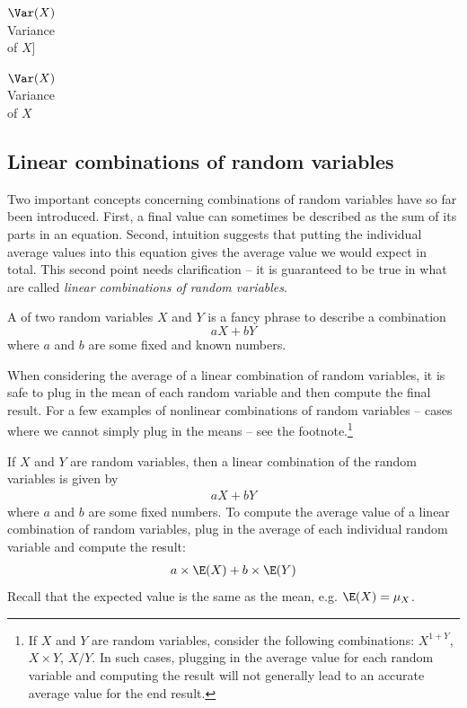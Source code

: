 $\Var(X)$\vspace{1mm}\\\footnotesize Variance\\of $X$]{\raggedright\vspace{-47mm}

$\Var(X)$\vspace{1mm}\\\footnotesize Variance\\of $X$}


\subsection{Linear combinations of random variables}

Two important concepts concerning combinations of random variables have so far been introduced. First, a final value can sometimes be described as the sum of its parts in an equation. Second, intuition suggests that putting the individual average values into this equation gives the average value we would expect in total. This second point needs clarification -- it is guaranteed to be true in what are called \emph{linear combinations of random variables}.

A  of two random variables $X$ and $Y$ is a fancy phrase to describe a combination
$$ aX + bY$$
where $a$ and $b$ are some fixed and known numbers.

When considering the average of a linear combination of random variables, it is safe to plug in the mean of each random variable and then compute the final result. For a few examples of nonlinear combinations of random variables -- cases where we cannot simply plug in the means -- see the footnote.\footnote{If $X$ and $Y$ are random variables, consider the following combinations: $X^{1+Y}$, $X\times Y$, $X/Y$. In such cases, plugging in the average value for each random variable and computing the result will not generally lead to an accurate average value for the end result.}

\begin{termBox}{
If $X$ and $Y$ are random variables, then a linear combination of the random variables is given by
\begin{align}\label{linComboOfRandomVariablesXAndY}
aX + bY
\end{align}
where $a$ and $b$ are some fixed numbers. To compute the average value of a linear combination of random variables, plug in the average of each individual random variable and compute the result:
\begin{align*}
a\times \E(X) + b\times \E(Y)
\end{align*}
Recall that the expected value is the same as the mean, e.g. $\E(X) = \mu_X$.}
\end{termBox}

